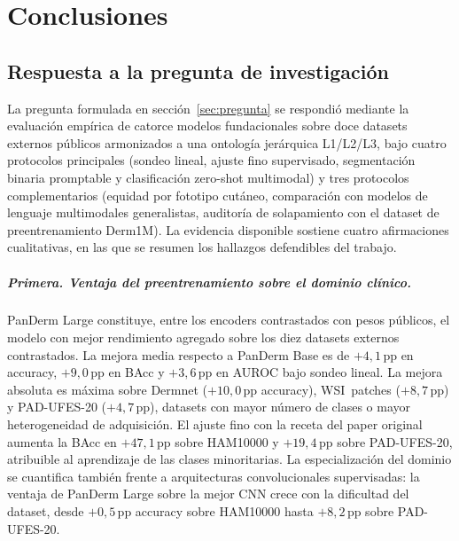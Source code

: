 
\chapter{Conclusiones}
\label{cap:conclusiones}

\section{Respuesta a la pregunta de investigación}
\label{sec:respuesta}

La pregunta formulada en sección~\ref{sec:pregunta} se respondió mediante
la evaluación empírica de catorce modelos fundacionales sobre doce
datasets externos públicos armonizados a una ontología jerárquica
L1/L2/L3, bajo cuatro protocolos principales (sondeo lineal,
ajuste fino supervisado, segmentación binaria promptable y
clasificación zero-shot multimodal) y tres protocolos
complementarios (equidad por fototipo cutáneo, comparación con
modelos de lenguaje multimodales generalistas, auditoría de
solapamiento con el dataset de preentrenamiento Derm1M). La
evidencia disponible sostiene cuatro afirmaciones cualitativas, en
las que se resumen los hallazgos defendibles del trabajo.

\paragraph{Primera. Ventaja del preentrenamiento sobre el dominio
clínico.}
PanDerm Large constituye, entre los encoders contrastados con
pesos públicos, el modelo con mejor rendimiento agregado sobre los
diez datasets externos contrastados. La mejora media respecto a
PanDerm Base es de $+4{,}1$\,pp en accuracy, $+9{,}0$\,pp en
BAcc y $+3{,}6$\,pp en AUROC bajo sondeo lineal. La mejora
absoluta es máxima sobre Dermnet ($+10{,}0$\,pp accuracy),
WSI~patches ($+8{,}7$\,pp) y PAD-UFES-20 ($+4{,}7$\,pp),
datasets con mayor número de clases o mayor heterogeneidad de
adquisición. El ajuste fino con la receta del paper original
aumenta la BAcc en $+47{,}1$\,pp sobre HAM10000 y
$+19{,}4$\,pp sobre PAD-UFES-20, atribuible al aprendizaje de las
clases minoritarias. La especialización del dominio se cuantifica
también frente a arquitecturas convolucionales supervisadas: la
ventaja de PanDerm Large sobre la mejor CNN crece con la dificultad
del dataset, desde $+0{,}5$\,pp accuracy sobre HAM10000 hasta
$+8{,}2$\,pp sobre PAD-UFES-20.


